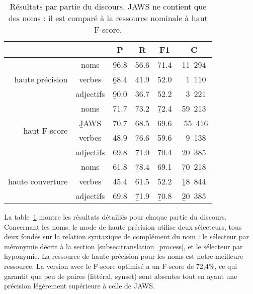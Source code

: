 \begin{table}[ht]
\centering
\begin{tabular}{rccccc}
  \toprule
                                    &   &     P    &     R    & F1       &    C       \\ \hline
  \multirow{3}{*}{haute précision}  & noms      & \b{96.8} & 56.6     & 71.4     & 11~294     \\ 
                                    & verbes    & \b{68.4} & 41.9     & 52.0     & ~1~110     \\ 
                                    & adjectifs & \b{90.0} & 36.7    & 52.2    & ~3~221     \\ \hline
  \multirow{4}{*}{haut F-score}     & noms & 71.7     & 73.2     & \b{72.4} & 59~213     \\ 
                                    & \b{JAWS}     & 70.7     & 68.5  & 69.6 & ~55~416  \\
                                    & verbes & 48.9     & \b{76.6} & \b{59.6} & ~9~138     \\ 
                                    & adjectifs & 69.8     & 71.0 & 70.4 & 20~385     \\ \hline
  \multirow{3}{*}{haute couverture} & noms & 61.8     & \b{78.4} & 69.1     & \b{70~218} \\ 
                                    & verbes & 45.4     & 61.5     & 52.2     & \b{18~844} \\ 
                                    & adjectifs & 69.8     & \b{71.9}     & \b{70.8}     & \b{20~385} \\ 
  \bottomrule
\end{tabular}
\caption{\protect\centering\label{table:posfull}Résultats par partie du discours. JAWS ne contient que des noms : il est comparé à la ressource nominale à haut F-score.}
\end{table}

La table~\ref{table:posfull} montre les résultats détaillés pour chaque partie du discours. Concernant les noms, le mode de haute précision utilise deux sélecteurs, tous deux fondés sur la relation syntaxique de complément du nom : le sélecteur par méronymie décrit à la section \ref{subsec:translation_process}, et le sélecteur par hyponymie. La ressource de haute précision pour les noms est notre meilleure ressource. La version avec le F-score optimisé a un F-score de 72,4\%, ce qui garantit que peu de paires (littéral, synset) sont absentes tout en ayant une précision légèrement supérieure à celle de JAWS.

